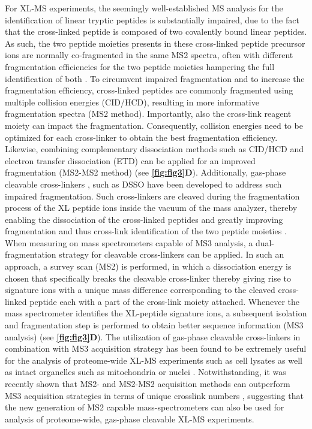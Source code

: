 For XL-MS experiments, the seemingly well-established MS analysis for the identification of linear tryptic peptides is substantially impaired, due to the fact that the cross-linked peptide is composed of two covalently bound linear peptides. As such, the two peptide moieties presents in these cross-linked peptide precursor ions are normally co-fragmented in the same MS2 spectra, often with different fragmentation efficiencies for the two peptide moieties hampering the full identification of both \cite{Liu_2017a}. To circumvent impaired fragmentation and to increase the fragmentation efficiency, cross-linked peptides are commonly fragmented using multiple collision energies (CID/HCD), resulting in more informative fragmentation spectra (MS2 method). Importantly, also the cross-link reagent moiety can impact the fragmentation. Consequently, collision energies need to be optimized for each cross-linker to obtain the best fragmentation efficiency. Likewise, combining complementary dissociation methods such as CID/HCD and electron transfer dissociation (ETD) can be applied for an improved fragmentation (MS2-MS2 method) \cite{Campbell_2009, Frese_2012, Liu_2017b} (see \textbf{\autoref{fig:fig3}D}). Additionally, gas-phase cleavable cross-linkers \cite{Sinz_2017}, such as DSSO have been developed to address such impaired fragmentation. Such cross-linkers are cleaved during the fragmentation process of the XL peptide ions inside the vacuum of the mass analyzer, thereby enabling the dissociation of the cross-linked peptides and greatly improving fragmentation and thus cross-link identification of the two peptide moieties \cite{Liu_2017a}. When measuring on mass spectrometers capable of MS3 analysis, a dual-fragmentation strategy for cleavable cross-linkers can be applied. In such an approach, a survey scan (MS2) is performed, in which a dissociation energy is chosen that specifically breaks the cleavable cross-linker thereby giving rise to signature ions with a unique mass difference corresponding to the cleaved cross-linked peptide each with a part of the cross-link moiety attached. Whenever the mass spectrometer identifies the XL-peptide signature ions, a subsequent isolation and fragmentation step is performed to obtain better sequence information (MS3 analysis) \cite{Liu_2017a, Sinz_2017} (see \textbf{\autoref{fig:fig3}D}). The utilization of gas-phase cleavable cross-linkers in combination with MS3 acquisition strategy has been found to be extremely useful for the analysis of proteome-wide XL-MS experiments such as cell lysates \cite{Klykov_2018, Liu_2017a} as well as intact organelles such as mitochondria \cite{Liu_2018} or nuclei \cite{Fasci_2018}. Notwithstanding, it was recently shown that MS2- and MS2-MS2 acquisition methods can outperform MS3 acquisition strategies in terms of unique crosslink numbers \cite{Matzinger_2022}, suggesting that the new generation of MS2 capable mass-spectrometers can also be used for analysis of proteome-wide, gas-phase cleavable XL-MS experiments. 

